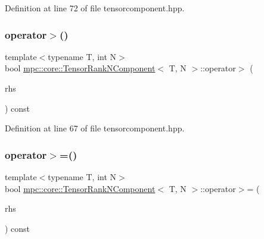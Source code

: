 Definition at line 72 of file tensorcomponent.\+hpp.

\mbox{\label{classmpc_1_1core_1_1_tensor_rank_n_component_aea9710656c2dfba2e031476c9662f937}} 
\subsubsection{\texorpdfstring{operator$>$()}{operator>()}}
{\footnotesize\ttfamily template$<$typename T, int N$>$ \\
bool \mbox{\hyperlink{classmpc_1_1core_1_1_tensor_rank_n_component}{mpc\+::core\+::\+Tensor\+Rank\+N\+Component}}$<$ T, N $>$\+::operator$>$ (\begin{DoxyParamCaption}\item[{const \mbox{\hyperlink{classmpc_1_1core_1_1_tensor_rank_n_component}{Tensor\+Rank\+N\+Component}}$<$ T, N $>$ \&}]{rhs }\end{DoxyParamCaption}) const\hspace{0.3cm}{\ttfamily [inline]}}



Definition at line 67 of file tensorcomponent.\+hpp.

\mbox{\label{classmpc_1_1core_1_1_tensor_rank_n_component_a03ca8237de6ccde2a7bbdc68fc4712f4}} 
\subsubsection{\texorpdfstring{operator$>$=()}{operator>=()}}
{\footnotesize\ttfamily template$<$typename T, int N$>$ \\
bool \mbox{\hyperlink{classmpc_1_1core_1_1_tensor_rank_n_component}{mpc\+::core\+::\+Tensor\+Rank\+N\+Component}}$<$ T, N $>$\+::operator$>$= (\begin{DoxyParamCaption}\item[{const \mbox{\hyperlink{classmpc_1_1core_1_1_tensor_rank_n_component}{Tensor\+Rank\+N\+Component}}$<$ T, N $>$ \&}]{rhs }\end{DoxyParamCaption}) const\hspace{0.3cm}{\ttfamily [inline]}}



